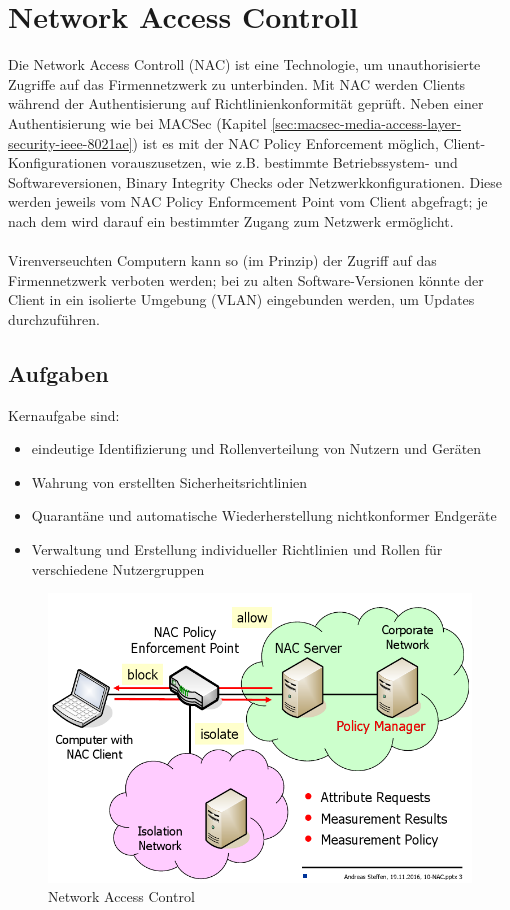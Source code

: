 \section{Network Access Controll}

Die Network Access Controll (NAC) ist eine Technologie, um unauthorisierte Zugriffe auf das Firmennetzwerk zu unterbinden. Mit NAC werden Clients während der Authentisierung auf Richtlinienkonformität geprüft. Neben einer Authentisierung wie bei MACSec (Kapitel \ref{sec:macsec-media-access-layer-security-ieee-8021ae}) ist es mit der NAC Policy Enforcement möglich, Client-Konfigurationen vorauszusetzen, wie z.B. bestimmte Betriebssystem- und Softwareversionen, Binary Integrity Checks oder Netzwerkkonfigurationen. Diese werden jeweils vom NAC Policy Enformcement Point vom Client abgefragt; je nach dem wird darauf ein bestimmter Zugang zum Netzwerk ermöglicht. \\\\
Virenverseuchten Computern kann so (im Prinzip) der Zugriff auf das Firmennetzwerk verboten werden; bei zu alten Software-Versionen könnte der Client in ein isolierte Umgebung (VLAN) eingebunden werden, um Updates durchzuführen. 

\subsection{Aufgaben}
Kernaufgabe sind:
\begin{itemize}
	\item eindeutige Identifizierung und Rollenverteilung von Nutzern und Geräten
	\item Wahrung von erstellten Sicherheitsrichtlinien
	\item Quarantäne und automatische Wiederherstellung nichtkonformer Endgeräte
	\item Verwaltung und Erstellung individueller Richtlinien und Rollen für verschiedene Nutzergruppen
\end{itemize}


\begin{figure}[h!]
\centering
\includegraphics[width=0.7\linewidth]{images/network_access_control}
\caption{Network Access Control}
\label{fig:networkaccesscontrol}
\end{figure}

